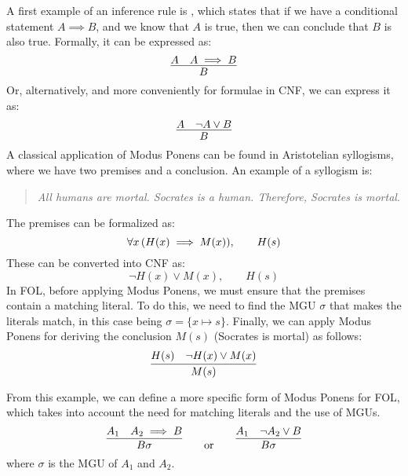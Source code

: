 A first example of an inference rule is , which states that if we have a conditional statement \(A \implies B\), and we know that \(A\) is true, then we can conclude that \(B\) is also true. Formally, it can be expressed as:
\begin{equation}  
  \infer{B}{A & A \implies B}
\end{equation}
Or, alternatively, and more conveniently for formulae in CNF, we can express it as:
\begin{equation}  
  \infer{B}{A & \neg A \lor B}
\end{equation}
A classical application of Modus Ponens can be found in Aristotelian syllogisms, where we have two premises and a conclusion.
An example of a syllogism is:
\begin{quote}
  \emph{All humans are mortal. Socrates is a human. Therefore, Socrates is mortal}.
\end{quote}
The premises can be formalized as:
\begin{equation}
  \forall x \, (H(x) \implies M(x)), \qquad H(s)
\end{equation}
These can be converted into CNF as:
\begin{equation}
    \neg H(x) \lor M(x), \qquad H(s)
\end{equation}
In FOL, before applying Modus Ponens, we must ensure that the premises contain a matching literal. To do this, we need to find the MGU \(\sigma\) that makes the literals match, in this case being \(\sigma = \{x\mapsto s\}\).
Finally, we can apply Modus Ponens for deriving the conclusion \(M(s)\) (Socrates is mortal) as follows:
\begin{equation}
  \infer{M(s)}{H(s) & \neg H(x) \lor M(x)}
\end{equation}

From this example, we can define a more specific form of Modus Ponens for FOL, which takes into account the need for matching literals and the use of MGUs.
\begin{equation}  
  \infer{B\sigma}{A_1 & A_2 \implies B} \qquad \text{or} \qquad \infer{B\sigma}{A_1 & \neg A_2 \lor B}
\end{equation}
where \(\sigma\) is the MGU of \(A_1\) and \(A_2\).

